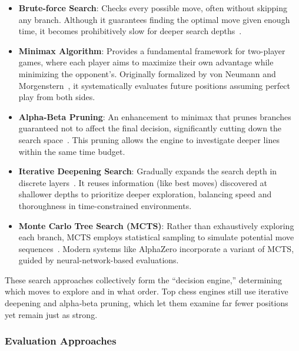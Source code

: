 \documentclass[12pt,a4paper]{article}
\begin{document}
\begin{itemize}
    \item \textbf{Brute-force Search}: 
    Checks every possible move, often without skipping any branch. Although it guarantees finding the optimal move given enough time, it becomes prohibitively slow for deeper search depths~\cite{Shannon1950}.

    \item \textbf{Minimax Algorithm}: 
    Provides a fundamental framework for two-player games, where each player aims to maximize their own advantage while minimizing the opponent’s. Originally formalized by von Neumann and Morgenstern~\cite{vonNeumann1944}, it systematically evaluates future positions assuming perfect play from both sides.

    \item \textbf{Alpha-Beta Pruning}: 
    An enhancement to minimax that prunes branches guaranteed not to affect the final decision, significantly cutting down the search space~\cite{Knuth1975}. This pruning allows the engine to investigate deeper lines within the same time budget.

    \item \textbf{Iterative Deepening Search}:
    Gradually expands the search depth in discrete layers~\cite{Korf1985}. It reuses information (like best moves) discovered at shallower depths to prioritize deeper exploration, balancing speed and thoroughness in time-constrained environments.

    \item \textbf{Monte Carlo Tree Search (MCTS)}:
    Rather than exhaustively exploring each branch, MCTS employs statistical sampling to simulate potential move sequences~\cite{Coulom2006}. Modern systems like AlphaZero incorporate a variant of MCTS, guided by neural-network-based evaluations.

\end{itemize}

These search approaches collectively form the “decision engine,” determining which moves to explore and in what order. Top chess engines still use iterative deepening and alpha‑beta pruning, which let them examine far fewer positions yet remain just as strong.


\subsubsection{Evaluation Approaches}
\label{sec:evaluation_approaches}
\end{document}
